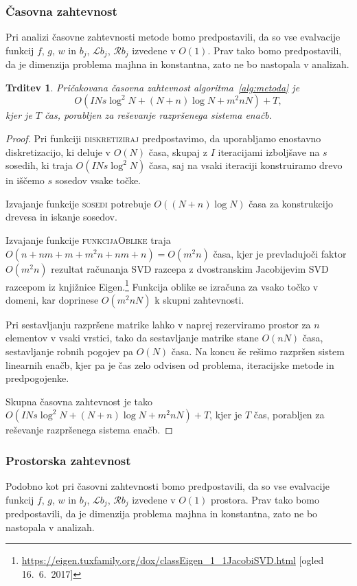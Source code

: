 \documentclass[12pt,a4paper,twoside]{article}
\theoremstyle{definition} %
\theoremstyle{plain} %
\newtheorem{trditev}[definicija]{Trditev}
\numberwithin{equation}{section}
\newcommand{\Rc}{\mathcal{R}}
\renewcommand{\L}{\mathcal{L}}
\begin{document}
\subsubsection{Časovna zahtevnost}
\label{sec:casovna-zahtevnost}
Pri analizi časovne zahtevnosti metode bomo predpostavili, da so
vse evalvacije funkcij $f$, $g$, $w$ in $b_j$, $\L b_j$, $\Rc b_j$ izvedene v $O(1)$.
Prav tako bomo predpostavili, da je dimenzija problema majhna in konstantna,
zato ne bo nastopala v analizah.

\begin{trditev}
  Pričakovana časovna zahtevnost algoritma~\ref{alg:metoda} je
  \begin{equation}
    O(I N s \log^2 N + (N+n)\log N + m^2n N) + T,
    \label{eq:casovna-zahtevnost}
  \end{equation}
  kjer je $T$ čas, porabljen za reševanje razpršenega sistema enačb.
\end{trditev}
\begin{proof}
Pri funkciji \textsc{diskretiziraj} predpostavimo, da uporabljamo enostavno
diskretizacijo, ki deluje v $O(N)$ časa, skupaj z $I$ iteracijami izboljšave
na $s$ sosedih, ki traja $O(I N s \log^2 N)$ časa, saj na vsaki iteraciji
konstruiramo drevo in iščemo $s$ sosedov vsake točke.

Izvajanje funkcije \textsc{sosedi} potrebuje $O((N+n) \log N)$ časa za konstrukcijo
drevesa in iskanje sosedov.

Izvajanje funkcije \textsc{funkcijaOblike} traja $O(n + nm + m + m^2n + nm +
n) = O(m^2n)$ časa, kjer je prevladujoči faktor $O(m^2 n)$ rezultat računanja SVD
razcepa z dvostranskim Jacobijevim SVD razcepom iz knjižnice
Eigen.\footnote{\url{https://eigen.tuxfamily.org/dox/classEigen_1_1JacobiSVD.html}
[ogled 16.\ 6.\ 2017]} Funkcija oblike se izračuna za vsako točko v domeni,
kar doprinese $O(m^2 n N)$ k skupni zahtevnosti.

Pri sestavljanju razpršene matrike lahko v naprej rezerviramo prostor za $n$
elementov v vsaki vrstici, tako da sestavljanje matrike stane $O(nN)$ časa,
sestavljanje robnih pogojev pa $O(N)$ časa. Na koncu še rešimo razpršen sistem
linearnih enačb, kjer pa je čas zelo odvisen od problema, iteracijske metode in
predpogojenke.

Skupna časovna zahtevnost je tako $O(I N s \log^2 N + (N+n)\log N + m^2n N) + T$,
kjer je $T$ čas, porabljen za reševanje razpršenega sistema enačb.
\end{proof}

\subsubsection{Prostorska zahtevnost}
Podobno kot pri časovni zahtevnosti bomo predpostavili, da so vse evalvacije funkcij $f$, $g$, $w$
in $b_j$, $\L b_j$, $\Rc b_j$ izvedene v $O(1)$ prostora. Prav tako bomo predpostavili, da je
dimenzija problema majhna in konstantna, zato ne bo nastopala v analizah.
\end{document}
